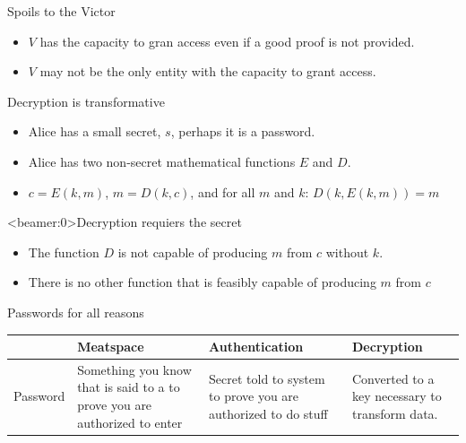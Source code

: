 \documentclass[xcolor={dvipsnames,table,hyperref}]{beamer}
\begin{document}
\begin{frame}{Spoils to the Victor}
  \begin{itemize}
    \item $V$ has the capacity to gran access even if a good proof is not provided.
    \item $V$ may not be the only entity with the capacity to grant access.
  \end{itemize}
\end{frame}

\begin{frame}{Decryption is transformative}
  \begin{itemize}
    \item Alice has a small secret, $s$, perhaps it is a password.
    \item Alice has two non-secret mathematical functions $E$ and $D$.
    \item $c = E(k, m)$, $m = D(k, c)$, and for all $m$ and $k$: $D(k, E(k, m)) = m$
  \end{itemize}
\end{frame}

\begin{frame}<beamer:0>{Decryption requiers the secret}
  \begin{itemize}
    \item The function $D$ is not capable of producing $m$ from $c$ without $k$.
    \item There is no other function that is feasibly capable of producing $m$ from $c$
  \end{itemize}

\end{frame}

\begin{frame}{Passwords for all reasons}
  \begin{table}
    \begin{tabular}{lP{0.25\textwidth}P{0.25\textwidth}P{0.25\textwidth}}
      & Meatspace
      & Authentication
      & Decryption \\
      \midrule
      Password
      & Something you know that is said to a to prove you are authorized to enter
      & Secret told to system to prove you are authorized to do stuff
      & Converted to a key necessary to transform data.

    \end{tabular}
  \end{table}
\end{frame}
\end{document}

